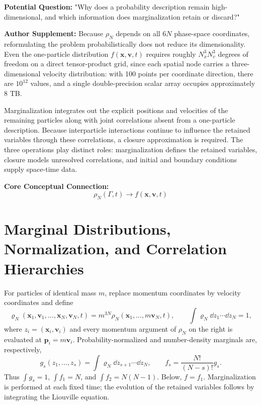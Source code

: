 \begin{authornote}
\textbf{Potential Question:}
"Why does a probability description remain high-dimensional, and which information does marginalization retain or discard?"

\textbf{Author Supplement:}
Because \(\rho_N\) depends on all \(6N\) phase-space coordinates, reformulating the problem probabilistically does not reduce its dimensionality. Even the one-particle distribution \(f(\bm x,\bm v,t)\) requires roughly \(N_x^3N_v^3\) degrees of freedom on a direct tensor-product grid, since each spatial node carries a three-dimensional velocity distribution: with 100 points per coordinate direction, there are \(10^{12}\) values, and a single double-precision scalar array occupies approximately 8 TB.

Marginalization integrates out the explicit positions and velocities of the remaining particles along with joint correlations absent from a one-particle description. Because interparticle interactions continue to influence the retained variables through these correlations, a closure approximation is required. The three operations play distinct roles: marginalization defines the retained variables, closure models unresolved correlations, and initial and boundary conditions supply space-time data.

\textbf{Core Conceptual Connection:}
\[
\rho_N(\Gamma,t)
\longrightarrow
f(\bm x,\bm v,t)
\]
\end{authornote}

\section{Marginal Distributions, Normalization, and Correlation Hierarchies}
For particles of identical mass $m$, replace momentum coordinates by velocity coordinates and define
\[
\varrho_N(\bm x_1,\bm v_1,\ldots,\bm x_N,\bm v_N,t)
=m^{3N}\rho_N(\bm x_1,\ldots,m\bm v_N,t),\qquad
\int\varrho_N\dd z_1\cdots\dd z_N=1,
\]
where $z_i=(\bm x_i,\bm v_i)$ and every momentum argument of $\rho_N$ on the right is evaluated at $\bm p_i=m\bm v_i$.
Probability-normalized and number-density marginals are, respectively,
\[
g_s(z_1,\ldots,z_s)=\int\varrho_N\dd z_{s+1}\cdots\dd z_N,\qquad
f_s=\frac{N!}{(N-s)!}g_s.
\]
Thus $\int g_s=1$, $\int f_1=N$, and $\int f_2=N(N-1)$. Below, $f=f_1$.
Marginalization is performed at each fixed time; the evolution of the retained variables follows by integrating the Liouville equation.

